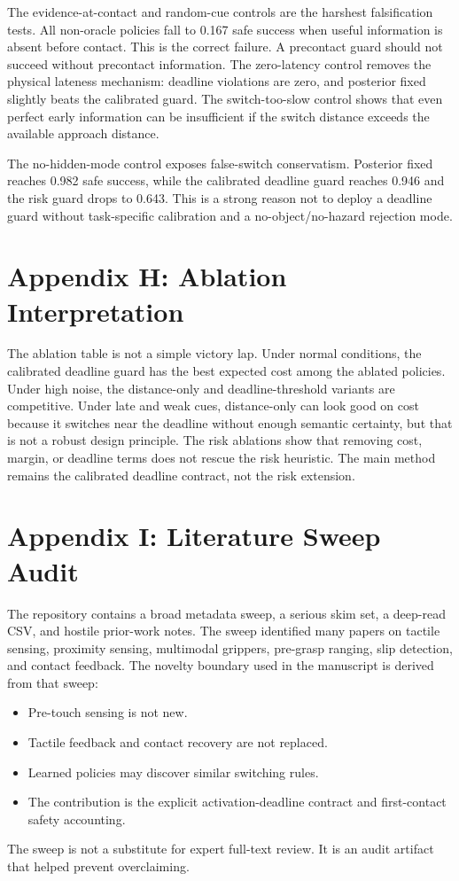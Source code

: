 \documentclass{article}
\begin{document}
The evidence-at-contact and random-cue controls are the harshest falsification tests. All non-oracle policies fall to 0.167 safe success when useful information is absent before contact. This is the correct failure. A precontact guard should not succeed without precontact information. The zero-latency control removes the physical lateness mechanism: deadline violations are zero, and posterior fixed slightly beats the calibrated guard. The switch-too-slow control shows that even perfect early information can be insufficient if the switch distance exceeds the available approach distance.

The no-hidden-mode control exposes false-switch conservatism. Posterior fixed reaches 0.982 safe success, while the calibrated deadline guard reaches 0.946 and the risk guard drops to 0.643. This is a strong reason not to deploy a deadline guard without task-specific calibration and a no-object/no-hazard rejection mode.

\section{Appendix H: Ablation Interpretation}

The ablation table is not a simple victory lap. Under normal conditions, the calibrated deadline guard has the best expected cost among the ablated policies. Under high noise, the distance-only and deadline-threshold variants are competitive. Under late and weak cues, distance-only can look good on cost because it switches near the deadline without enough semantic certainty, but that is not a robust design principle. The risk ablations show that removing cost, margin, or deadline terms does not rescue the risk heuristic. The main method remains the calibrated deadline contract, not the risk extension.

\section{Appendix I: Literature Sweep Audit}

The repository contains a broad metadata sweep, a serious skim set, a deep-read CSV, and hostile prior-work notes. The sweep identified many papers on tactile sensing, proximity sensing, multimodal grippers, pre-grasp ranging, slip detection, and contact feedback. The novelty boundary used in the manuscript is derived from that sweep:
\begin{itemize}
\item Pre-touch sensing is not new.
\item Tactile feedback and contact recovery are not replaced.
\item Learned policies may discover similar switching rules.
\item The contribution is the explicit activation-deadline contract and first-contact safety accounting.
\end{itemize}
The sweep is not a substitute for expert full-text review. It is an audit artifact that helped prevent overclaiming.
\end{document}

